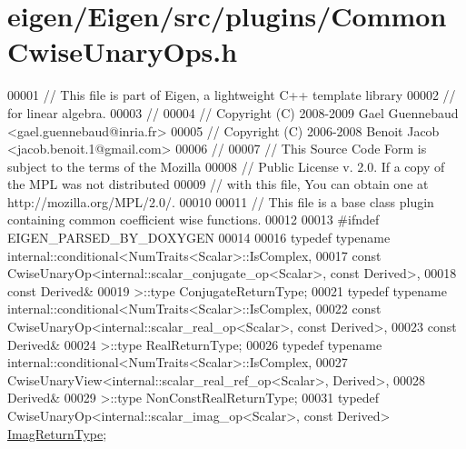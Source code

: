 \hypertarget{eigen_2_eigen_2src_2plugins_2_common_cwise_unary_ops_8h_source}{}\section{eigen/\+Eigen/src/plugins/\+Common\+Cwise\+Unary\+Ops.h}
\label{eigen_2_eigen_2src_2plugins_2_common_cwise_unary_ops_8h_source}

\begin{DoxyCode}
00001 \textcolor{comment}{// This file is part of Eigen, a lightweight C++ template library}
00002 \textcolor{comment}{// for linear algebra.}
00003 \textcolor{comment}{//}
00004 \textcolor{comment}{// Copyright (C) 2008-2009 Gael Guennebaud <gael.guennebaud@inria.fr>}
00005 \textcolor{comment}{// Copyright (C) 2006-2008 Benoit Jacob <jacob.benoit.1@gmail.com>}
00006 \textcolor{comment}{//}
00007 \textcolor{comment}{// This Source Code Form is subject to the terms of the Mozilla}
00008 \textcolor{comment}{// Public License v. 2.0. If a copy of the MPL was not distributed}
00009 \textcolor{comment}{// with this file, You can obtain one at http://mozilla.org/MPL/2.0/.}
00010 
00011 \textcolor{comment}{// This file is a base class plugin containing common coefficient wise functions.}
00012 
00013 \textcolor{preprocessor}{#ifndef EIGEN\_PARSED\_BY\_DOXYGEN}
00014 
00016 \textcolor{keyword}{typedef} \textcolor{keyword}{typename} internal::conditional<NumTraits<Scalar>::IsComplex,
00017                     \textcolor{keyword}{const} CwiseUnaryOp<internal::scalar\_conjugate\_op<Scalar>, \textcolor{keyword}{const} Derived>,
00018                     \textcolor{keyword}{const} Derived&
00019                   >::type ConjugateReturnType;
00021 \textcolor{keyword}{typedef} \textcolor{keyword}{typename} internal::conditional<NumTraits<Scalar>::IsComplex,
00022                     \textcolor{keyword}{const} CwiseUnaryOp<internal::scalar\_real\_op<Scalar>, \textcolor{keyword}{const} Derived>,
00023                     \textcolor{keyword}{const} Derived&
00024                   >::type RealReturnType;
00026 \textcolor{keyword}{typedef} \textcolor{keyword}{typename} internal::conditional<NumTraits<Scalar>::IsComplex,
00027                     CwiseUnaryView<internal::scalar\_real\_ref\_op<Scalar>, Derived>,
00028                     Derived&
00029                   >::type NonConstRealReturnType;
00031 \textcolor{keyword}{typedef} CwiseUnaryOp<internal::scalar\_imag\_op<Scalar>, \textcolor{keyword}{const} Derived> 
      \hyperlink{group___core___module_class_eigen_1_1_cwise_unary_op}{ImagReturnType};

\end{DoxyCode}
